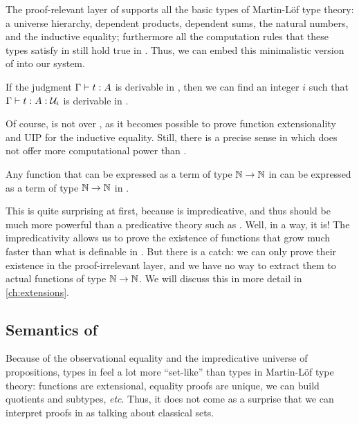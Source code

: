 The proof-relevant layer of \SetoidCC supports all the basic types of Martin-Löf 
type theory: a universe hierarchy, dependent products, dependent sums, the natural 
numbers, and the inductive equality; furthermore all the computation rules that 
these types satisfy in \MLTT still hold true in \SetoidCC.
% 
Thus, we can embed this minimalistic version of \MLTT into our system.

\begin{theorem}[Embedding]
	If the judgment \( \Gamma \vdash t : A \) is derivable in \MLTT, then
	we can find an integer \( i \) such that \( \Gamma \vdash t : A : \mathcal{U}_i \)
	is derivable in \SetoidCC. 
\end{theorem} 

Of course, \SetoidCC is not 
over \MLTT, as it becomes possible to prove function extensionality 
and UIP for the inductive equality.
% 
Still, there is a precise sense in which \SetoidCC does not offer more
computational power than \MLTT. 

\begin{theorem}
	Any function that can be expressed as a term of type \( \mathbb{N} \to \mathbb{N} \)
	in \SetoidCC can be expressed as a term of type \( \mathbb{N} \to \mathbb{N} \) in
	\MLTT.
\end{theorem}

This is quite surprising at first, because \SetoidCC is impredicative, and thus
should be much more powerful than a predicative theory such as \MLTT. 
% 
Well, in a way, it is! The impredicativity allows us to prove the existence
of functions that grow much faster than what is definable in \MLTT. But there is
a catch: we can only prove their existence in the proof-irrelevant layer, and
we have no way to extract them to actual functions of type \( \mathbb{N} \to \mathbb{N} \).
We will discuss this in more detail in \cref{ch:extensions}.

\subsection{Semantics of \SetoidCC}

Because of the observational equality and the impredicative universe of 
propositions, types in \SetoidCC feel a lot more ``set-like'' than types
in Martin-Löf type theory: functions are extensional, equality 
proofs are unique, we can build quotients and subtypes, \textit{etc}.
% 
Thus, it does not come as a surprise that we can interpret proofs in 
\SetoidCC as talking about classical sets.

